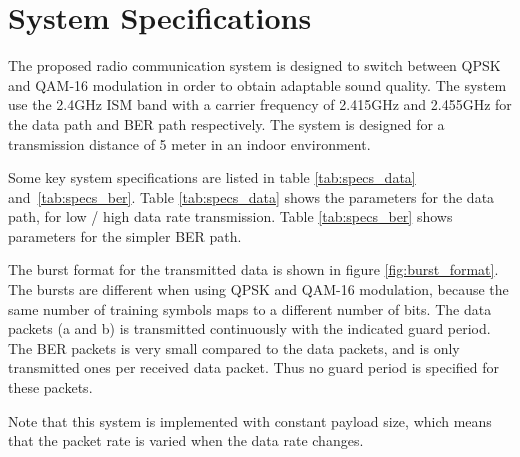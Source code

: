 \section{System Specifications}
\label{sec:specifications}
The proposed radio communication system is designed to switch between QPSK and QAM-16 modulation in order to obtain adaptable sound quality. The system use the 2.4GHz ISM band with a carrier frequency of 2.415GHz and 2.455GHz for the data path and BER path respectively. The system is designed for a transmission distance of 5 meter in an indoor environment. 

Some key system specifications are listed in table \ref{tab:specs_data} and \ref{tab:specs_ber}. Table \ref{tab:specs_data} shows the parameters for the data path, for low / high data rate transmission. Table \ref{tab:specs_ber} shows parameters for the simpler BER path. 


The burst format for the transmitted data is shown in figure \ref{fig:burst_format}. The bursts are different when using QPSK and QAM-16 modulation, because the same number of training symbols maps to a different number of bits. The data packets (a and b) is transmitted continuously with the indicated guard period. The BER packets is very small compared to the data packets, and is only transmitted ones per received data packet. Thus no guard period is specified for these packets. 

Note that this system is implemented with constant payload size, which means that the packet rate is varied when the data rate changes.

 